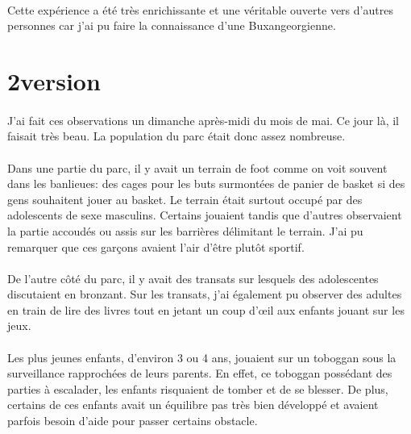 \paragraph{} Cette expérience a été très enrichissante et une véritable ouverte
vers d'autres personnes car j'ai pu faire la connaissance d'une
Buxangeorgienne.

\section{2\ieme version}

\paragraph{} J'ai fait ces observations un dimanche après-midi du mois de mai.
Ce jour là, il faisait très beau. La population du parc était donc assez
nombreuse.

\paragraph{} Dans une partie du parc, il y avait un terrain de foot comme on
voit souvent dans les banlieues: des cages pour les buts surmontées de panier
de basket si des gens souhaitent jouer au basket. Le terrain était surtout
occupé par des adolescents de sexe masculins. Certains jouaient tandis que
d'autres observaient la partie accoudés ou assis sur les barrières délimitant
le terrain. J'ai pu remarquer que ces garçons avaient l'air d'être plutôt
sportif.

\paragraph{} De l'autre côté du parc, il y avait des transats sur lesquels des
adolescentes discutaient en bronzant. Sur les transats, j'ai également pu
observer des adultes en train de lire des livres tout en jetant un coup d'œil
aux enfants jouant sur les jeux.

\paragraph{} Les plus jeunes enfants, d'environ 3 ou 4 ans, jouaient sur un
toboggan sous la surveillance rapprochées de leurs parents. En effet, ce
toboggan possédant des parties à escalader, les enfants risquaient de tomber et
de se blesser. De plus, certains de ces enfants avait un équilibre pas très
bien développé et avaient parfois besoin d'aide pour passer certains obstacle.

